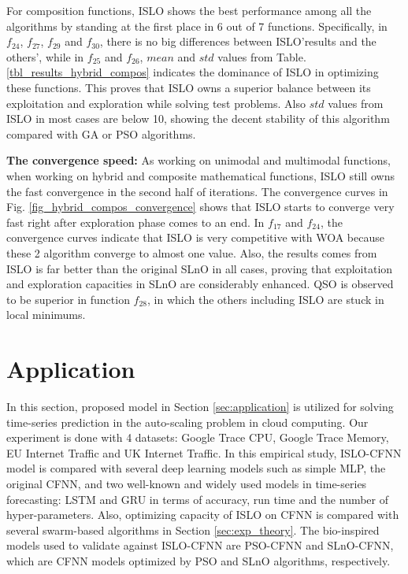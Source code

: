 \documentclass[a4paper,13pt,2p]{report}
\begin{document}
	For composition functions, ISLO shows the best performance among all the algorithms by standing at the first place in 6 out of 7 functions. Specifically, in $f_{24}$, $f_{27}$, $f_{29}$ and $f_{30}$, there is no big differences between ISLO'results and the others', while in $f_{25}$ and $f_{26}$, $mean$ and $std$ values from Table. \ref{tbl_results_hybrid_compos} indicates the dominance of ISLO in optimizing these functions. This proves that ISLO owns a superior balance between its exploitation and exploration while solving test problems. Also $std$ values from ISLO in most cases are below 10, showing the decent stability of this algorithm compared with GA or PSO algorithms.
	
	\textbf{The convergence speed:} As working on unimodal and multimodal functions, when working on hybrid and composite mathematical functions, ISLO still owns the fast convergence in the second half of iterations. The convergence curves in Fig. \ref{fig_hybrid_compos_convergence} shows that ISLO starts to converge very fast right after exploration phase comes to an end. In $f_{17}$ and $f_{24}$, the convergence curves indicate that ISLO is very competitive with WOA because these 2 algorithm converge to almost one value. Also, the results comes from ISLO is far better than the original SLnO in all cases, proving that exploitation and exploration capacities in SLnO are considerably enhanced. QSO is observed to be superior in function $f_{28}$, in which the others including ISLO are stuck in local minimums.   

\section{Application}
\label{sec:exp_app}
	
	In this section, proposed model in Section \ref{sec:application} is utilized for solving time-series prediction in the auto-scaling problem in cloud computing. Our experiment is done with 4 datasets: Google Trace CPU, Google Trace Memory, EU Internet Traffic and UK Internet Traffic. In this empirical study, ISLO-CFNN model is compared with several deep learning models such as simple MLP, the original CFNN, and two well-known and widely used models in time-series forecasting: LSTM and GRU in terms of accuracy, run time and the number of hyper-parameters. Also, optimizing capacity of ISLO on CFNN is compared with several swarm-based algorithms in Section \ref{sec:exp_theory}. The bio-inspired models used to validate against ISLO-CFNN are PSO-CFNN and SLnO-CFNN, which are CFNN models optimized by PSO and SLnO algorithms, respectively.
	
\end{document}

